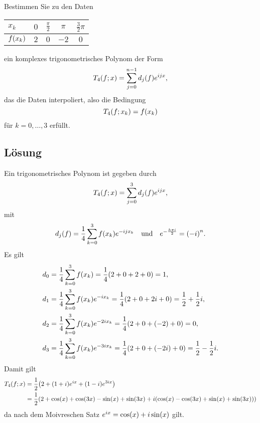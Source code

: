 \documentclass{exercise}
\begin{document}
    \begin{problem}
        Bestimmen Sie zu den Daten
        \begin{center}
            \begin{tabular}{lcccc}
                \toprule
                \(x_k\) & \(0\) & \(\frac{\pi}{2}\) & \(\pi\) & \(\frac{3}{2}\pi\)\\
                \midrule
                \(f\parentheses*{x_k}\) & \(2\) & \(0\) & \(-2\) & \(0\)\\
                \bottomrule
            \end{tabular}
        \end{center}
        ein komplexes trigonometrisches Polynom der Form
        \[
            T_4\parentheses*{f; x} = \sum_{j = 0}^{n - 1}d_j\parentheses*{f}e^{ijx},
        \]
        das die Daten interpoliert, also die Bedingung
        \[
            T_4\parentheses*{f; x_k} = f\parentheses*{x_k}
        \]
        für \(k = 0, \ldots, 3\) erfüllt.
    \end{problem}
    
    \subsection*{Lösung}
    Ein trigonometrisches Polynom ist gegeben durch
    \[
        T_4\parentheses*{f; x} = \sum_{j = 0}^3 d_j\parentheses*{f}e^{ijx},
    \]
    mit
    \[
        d_j\parentheses*{f} = \frac{1}{4}\sum_{k = 0}^3 f\parentheses*{x_k}e^{-ijx_k} \quad \text{und} \quad e^{-\frac{h\pi i}{2}} = \parentheses*{-i}^n.
    \]
    Es gilt
    \begin{align*}
        d_0 &= \frac{1}{4}\sum_{k = 0}^3 f\parentheses*{x_k} = \frac{1}{4}\parentheses*{2 + 0 + 2 + 0} = 1,\\
        d_1 &= \frac{1}{4}\sum_{k = 0}^3 f\parentheses*{x_k}e^{-ix_k} = \frac{1}{4}\parentheses*{2 + 0 + 2i + 0} = \frac{1}{2} + \frac{1}{2}i,\\
        d_2 &= \frac{1}{4}\sum_{k = 0}^3 f\parentheses*{x_k}e^{ -2ix_k} = \frac{1}{4}\parentheses*{2 + 0 + \parentheses*{-2} + 0} = 0,\\
        d_3 &= \frac{1}{4}\sum_{k = 0}^3 f\parentheses*{x_k}e^{-3ix_k} = \frac{1}{4}\parentheses*{2 + 0 + \parentheses*{-2i} + 0} = \frac{1}{2} - \frac{1}{2}i.
    \end{align*}
    Damit gilt
    \begin{align*}
        T_4\parentheses*{f; x} &= \frac{1}{2}\parentheses*{2 + \parentheses*{1 + i}e^{ix} + \parentheses*{1 - i}e^{3ix}}\\
        &= \frac{1}{2}\parentheses*{2 + \cos\parentheses*{x} + \cos\parentheses*{3x} - \sin\parentheses*{x} + \sin\parentheses*{3x} + i\parentheses*{\cos\parentheses*{x} - \cos\parentheses*{3x} + \sin\parentheses*{x} + \sin\parentheses*{3x}}}
    \end{align*}
    da nach dem Moivreschen Satz \(e^{ix} = \cos\parentheses*{x} + i\sin\parentheses*{x}\) gilt.
\end{document}
